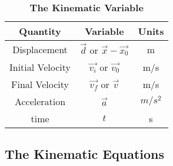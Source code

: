 \begin{center}
	
	
	\begin{table}[ht]\caption{\textbf{The Kinematic Variable}}%
		\centering %
		\begin{tabular}{|c|c|c|}
			\hline \hline
			\textbf{Quantity} & \textbf{Variable} & \textbf{Units} \\
			\hline
			Displacement & $\vec{d}$ or $\vec{x}-\vec{x_0}$  & m \\
			\hline
			
			Initial Velocity & $\vec{v_i}$ or $\vec{v_0}$  & m/s \\
			\hline
			
			Final Velocity & $\vec{v_f}$ or $\vec{v}$  & m/s \\
			\hline
			
			Acceleration & $\vec{a}$   & $m/s^2$ \\
			\hline
			
			time & $t $  & s \\
			\hline
		\end{tabular}
		\label{table:kinematic1d}%
	\end{table}
\end{center}

\subsection{The Kinematic Equations}

